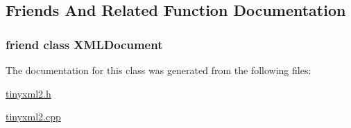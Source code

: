 \subsection{Friends And Related Function Documentation}
\hypertarget{classtinyxml2_1_1_x_m_l_unknown_a4eee3bda60c60a30e4e8cd4ea91c4c6e}{}
\subsubsection[{X\+M\+L\+Document}]{\setlength{\rightskip}{0pt plus 5cm}friend class {\bf X\+M\+L\+Document}\hspace{0.3cm}{\ttfamily [friend]}}\label{classtinyxml2_1_1_x_m_l_unknown_a4eee3bda60c60a30e4e8cd4ea91c4c6e}


The documentation for this class was generated from the following files\+:\begin{DoxyCompactItemize}
\item 
\hyperlink{tinyxml2_8h}{tinyxml2.\+h}\item 
\hyperlink{tinyxml2_8cpp}{tinyxml2.\+cpp}\end{DoxyCompactItemize}
